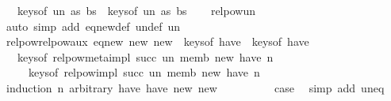 \begin{isabellebody}
\ \ {\isasymLongrightarrow}\ keys{\isacharunderscore}{\kern0pt}of\ {\isacharparenleft}{\kern0pt}un\ as\ bs{\isacharparenright}{\kern0pt}\ {\isacharequal}{\kern0pt}\ keys{\isacharunderscore}{\kern0pt}of\ {\isacharparenleft}{\kern0pt}un{\isacharprime}{\kern0pt}\ as{\isacharprime}{\kern0pt}\ bs{\isacharprime}{\kern0pt}{\isacharparenright}{\kern0pt}{\isachardoublequoteclose}\isanewline
%
\isadelimproof
\ \ %
\endisadelimproof
%
\isatagproof
{}\isamarkupfalse%
\ relpow{\isacharprime}{\kern0pt}{\isachardot}{\kern0pt}un\ \isamarkupfalse%
\ {\isacharparenleft}{\kern0pt}auto\ simp\ add{\isacharcolon}{\kern0pt}\ eq{\isacharunderscore}{\kern0pt}new{\isacharunderscore}{\kern0pt}def\ un{\isacharprime}{\kern0pt}{\isacharunderscore}{\kern0pt}def\ un{\isacharparenright}{\kern0pt}%
\endisatagproof
{\isafoldproof}%
%
\isadelimproof
\isanewline
%
\endisadelimproof
\isanewline
{}\isamarkupfalse%
\ relpow{\isacharunderscore}{\kern0pt}relpow{\isacharprime}{\kern0pt}{\isacharunderscore}{\kern0pt}aux{\isacharcolon}{\kern0pt}\ {\isachardoublequoteopen}eq{\isacharunderscore}{\kern0pt}new\ new\ new{\isacharprime}{\kern0pt}\ {\isasymLongrightarrow}\ keys{\isacharunderscore}{\kern0pt}of\ have\ {\isacharequal}{\kern0pt}\ keys{\isacharunderscore}{\kern0pt}of\ have{\isacharprime}{\kern0pt}\isanewline
\ \ {\isasymLongrightarrow}\ keys{\isacharunderscore}{\kern0pt}of\ {\isacharparenleft}{\kern0pt}relpow{\isacharunderscore}{\kern0pt}meta{\isacharunderscore}{\kern0pt}impl\ succ\ un\ memb\ new\ have\ n{\isacharparenright}{\kern0pt}\isanewline
\ \ \ \ {\isacharequal}{\kern0pt}\ keys{\isacharunderscore}{\kern0pt}of\ {\isacharparenleft}{\kern0pt}relpow{\isacharunderscore}{\kern0pt}impl\ succ{\isacharprime}{\kern0pt}\ un{\isacharprime}{\kern0pt}\ memb\ new{\isacharprime}{\kern0pt}\ have{\isacharprime}{\kern0pt}\ n{\isacharparenright}{\kern0pt}{\isachardoublequoteclose}\isanewline
%
\isadelimproof
%
\endisadelimproof
%
\isatagproof
{}\isamarkupfalse%
\ {\isacharparenleft}{\kern0pt}induction\ n\ arbitrary{\isacharcolon}{\kern0pt}\ {\isachardoublequoteopen}have{\isachardoublequoteclose}\ have{\isacharprime}{\kern0pt}\ new\ new{\isacharprime}{\kern0pt}{\isacharparenright}{\kern0pt}\isanewline
\ \ \isamarkupfalse%
\ {}\isanewline
\ \ \isamarkupfalse%
\ \isamarkupfalse%
\ {\isacharquery}{\kern0pt}case\ \isamarkupfalse%
\ {\isacharparenleft}{\kern0pt}simp\ add{\isacharcolon}{\kern0pt}\ un{\isacharunderscore}{\kern0pt}eq{\isacharparenright}{\kern0pt}\isanewline
{}\isamarkupfalse%

\end{isabellebody}
